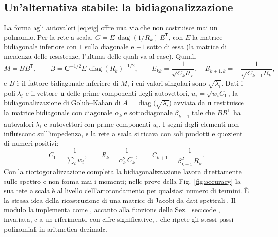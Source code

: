 \documentclass[10pt,a4paper]{scrartcl}
\let\newcommand\fcitdefine
\newcommand{\code}[1]{\texttt{#1}}
\begin{document}
\subsection{Un'alternativa stabile: la bidiagonalizzazione}
\label{sec:bidiag}
La forma agli autovalori \eqref{eq:eig} offre una via che non costruisce mai un polinomio. Per la rete a scala, $G = E\,\operatorname{diag}(1/R_k)\,E^\mathsf{T}$, con $E$ la matrice bidiagonale inferiore con $1$ sulla diagonale e $-1$ sotto di essa (la matrice di incidenza delle resistenze, l'ultima delle quali va al case). Quindi
\begin{equation}
M = BB^\mathsf{T} , \qquad B = \mathbf{C}^{-1/2} E\, \operatorname{diag}(R_k)^{-1/2} , \qquad B_{kk} = \frac{1}{\sqrt{C_kR_k}} , \quad B_{k+1,k} = -\frac{1}{\sqrt{C_{k+1}R_k}} ,
\end{equation}
e $B$ è il fattore bidiagonale inferiore di $M$, i cui valori singolari sono $\sqrt{\lambda_i}$. Dati i poli $\lambda_i$ e il vettore $\mathbf{u}$ delle prime componenti degli autovettori, $u_i = \sqrt{w_i C_1}$, la bidiagonalizzazione di Golub--Kahan di $A = \operatorname{diag}\bigl(\sqrt{\lambda_i}\bigr)$ avviata da $\mathbf{u}$ \cite{golubkahan1965,paige1982} restituisce la matrice bidiagonale con diagonale $\alpha_k$ e sottodiagonale $\beta_{k+1}$ tale che $BB^\mathsf{T}$ ha autovalori $\lambda_i$ e autovettori con prime componenti $u_i$. I segni degli elementi non influiscono sull'impedenza, e la rete a scala si ricava con soli prodotti e quozienti di numeri positivi:
\begin{equation}
C_1 = \frac{1}{\sum_i w_i} , \qquad R_k = \frac{1}{\alpha_k^2\, C_k} , \qquad C_{k+1} = \frac{1}{\beta_{k+1}^2\, R_k} .
\label{eq:bidiag}
\end{equation}
Con la riortogonalizzazione completa la bidiagonalizzazione lavora direttamente sullo spettro e non forma mai i momenti; nelle prove della Fig.~\ref{fig:accuracy} la sua rete a scala è al livello dell'arrotondamento per qualsiasi numero di termini. È la stessa idea della ricostruzione di una matrice di Jacobi da dati spettrali \cite{gragg1984}. Il modulo la implementa come , accanto alla funzione della Sez.~\ref{sec:code}, invariata, e a un riferimento con \fcmpDigits{} cifre significative, , che ripete gli stessi passi polinomiali in aritmetica decimale.
\end{document}
